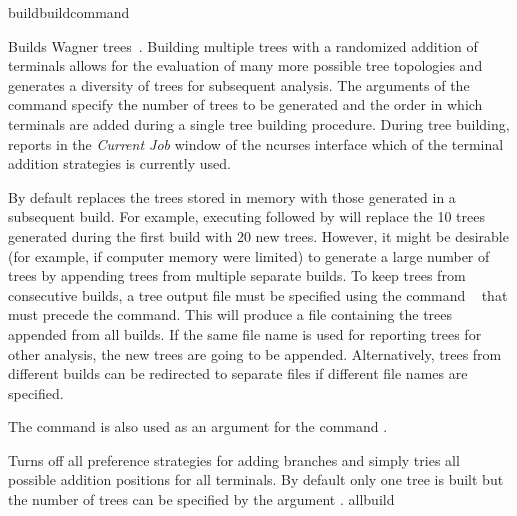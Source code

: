 \begin{command}{build}{buildcommand}

	
 	\begin{poydescription}
        Builds Wagner trees~\cite{farris1970}. Building multiple trees with a randomized addition of terminals allows for
        the evaluation of many more possible tree topologies and generates a diversity of trees for subsequent analysis. 
        The arguments of the command  specify the number of trees to be generated and
        the order in which terminals are added during a single tree building procedure. During tree
        building, \poy reports in the \emph{Current Job} window of the ncurses interface
        which of the terminal addition strategies is currently used.
        

        By default \poy replaces the trees stored in memory with those generated
        in a subsequent build. For example, executing 
        followed by  will replace the 10 trees generated
        during the first build with 20 new trees. However, it might be desirable
        (for example, if computer memory were limited) to generate a large number of trees by
        appending trees from multiple separate builds. To keep trees from consecutive
        builds, a tree output file must be specified using the command ~ that must 
        precede the  command. This will produce a file
        containing the trees appended from all builds. If the same file name is used for reporting
         trees for other analysis, the new trees are going to be appended. Alternatively, trees from different
        builds can be redirected to separate files if different file names are specified.
        
        The command  is also used as
        an argument for the command .
   	\end{poydescription}

\begin{arguments}

            {Turns off all preference strategies for adding branches
            and simply tries all possible addition positions for
            all terminals.  By default only one tree is built but
            the number of  trees can be specified by the argument .}
            {allbuild}


\end{arguments}
\end{command}
